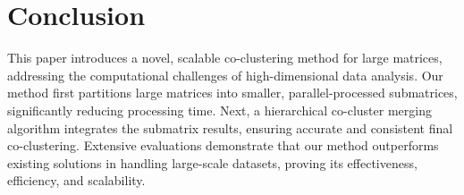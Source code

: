 
\section{Conclusion}
\label{sec:conclude}
This paper introduces a novel, scalable co-clustering method for large matrices, addressing the computational challenges of high-dimensional data analysis. Our method first partitions large matrices into smaller, parallel-processed submatrices, significantly reducing processing time. Next, a hierarchical co-cluster merging algorithm integrates the submatrix results, ensuring accurate and consistent final co-clustering. Extensive evaluations demonstrate that our method outperforms existing solutions in handling large-scale datasets, proving its effectiveness, efficiency, and scalability.
